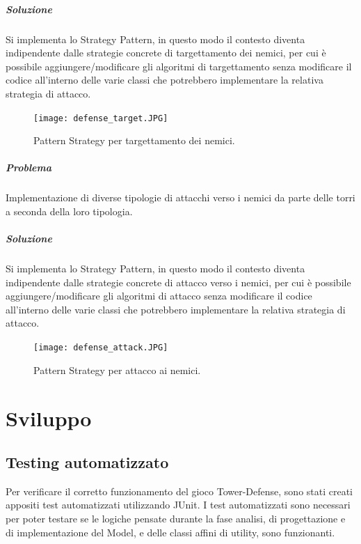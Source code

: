 \documentclass[a4paper,12pt]{report}
\begin{document}
\paragraph{Soluzione}
Si implementa lo Strategy Pattern, in questo modo il contesto diventa indipendente dalle strategie concrete di targettamento dei nemici, per cui è possibile aggiungere/modificare gli algoritmi di targettamento senza modificare il codice all'interno delle varie classi che potrebbero implementare la relativa strategia di attacco.

\begin{figure}[H]
    \centering
    \texttt{[image: defense\_target.JPG]}
    \caption{Pattern Strategy per targettamento dei nemici.}
    \label{fig:defense_target}
\end{figure}


\paragraph{Problema}
Implementazione di diverse tipologie di attacchi verso i nemici da parte delle torri a seconda della loro tipologia.
\paragraph{Soluzione}
Si implementa lo Strategy Pattern, in questo modo il contesto diventa indipendente dalle strategie concrete di attacco verso i nemici, per cui è possibile aggiungere/modificare gli algoritmi di attacco senza modificare il codice all'interno delle varie classi che potrebbero implementare la relativa strategia di attacco.

\begin{figure}[H]
    \centering
    \texttt{[image: defense\_attack.JPG]}
    \caption{Pattern Strategy per attacco ai nemici.}
    \label{fig:defense_attack}
\end{figure}

\chapter{Sviluppo}
\section{Testing automatizzato}
Per verificare il corretto funzionamento del gioco Tower-Defense, sono stati creati appositi test automatizzati utilizzando JUnit. 
I test automatizzati sono necessari per poter testare se le logiche pensate durante la fase analisi, di progettazione e di implementazione del Model, e delle classi affini di utility, sono funzionanti.
\end{document}
